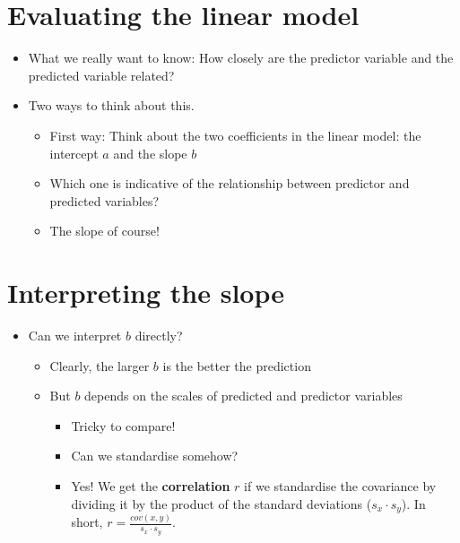 \documentclass[]{article}
\providecommand{\tightlist}{%
  \setlength{\itemsep}{0pt}\setlength{\parskip}{0pt}}
\begin{document}
\section{Evaluating the linear model}\label{evaluating-the-linear-model}

\begin{itemize}
\tightlist
\item
  What we really want to know: How closely are the predictor variable
  and the predicted variable related?
\item
  Two ways to think about this.

  \begin{itemize}
  \tightlist
  \item
    First way: Think about the two coefficients in the linear model: the
    intercept \(a\) and the slope \(b\)
  \item
    Which one is indicative of the relationship between predictor and
    predicted variables?
  \item
    The slope of course!
  \end{itemize}
\end{itemize}

\section{Interpreting the slope}\label{interpreting-the-slope}

\begin{itemize}
\tightlist
\item
  Can we interpret \(b\) directly?

  \begin{itemize}
  \tightlist
  \item
    Clearly, the larger \(b\) is the better the prediction
  \item
    But \(b\) depends on the scales of predicted and predictor variables

    \begin{itemize}
    \tightlist
    \item
      Tricky to compare!
    \item
      Can we standardise somehow?
    \item
      Yes! We get the \textbf{correlation} \(r\) if we standardise the
      covariance by dividing it by the product of the standard
      deviations (\(s_x \cdot s_y\)). In short,
      \(r = \frac{cov(x, y)}{s_x \cdot s_y}\).
    \end{itemize}
  \end{itemize}
\end{itemize}
\end{document}
